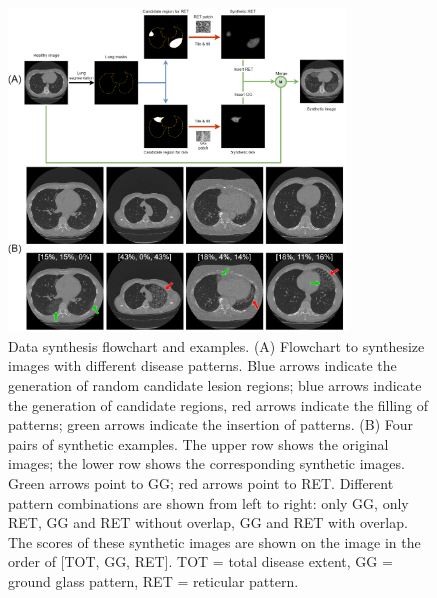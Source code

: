 \begin{figure}[tb]
    \centering
    \includegraphics[width=0.8\textwidth]{figure4.png}
    \caption{Data synthesis flowchart and examples. (A) Flowchart to synthesize images with different disease patterns. Blue arrows indicate the generation of random candidate lesion regions; blue arrows indicate the generation of candidate regions, red arrows indicate the filling of patterns; green arrows indicate the insertion of patterns. (B) Four pairs of synthetic examples. The upper row shows the original images; the lower row shows the corresponding synthetic images. Green arrows point to GG; red arrows point to RET. Different pattern combinations are shown from left to right: only GG, only RET, GG and RET without overlap, GG and RET with overlap. The scores of these synthetic images are shown on the image in the order of [TOT, GG, RET]. TOT = total disease extent, GG = ground glass pattern, RET = reticular pattern.}
    \label{fig4}
\end{figure}


